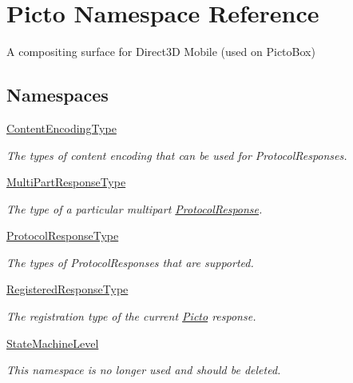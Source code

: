 \hypertarget{namespace_picto}{\section{Picto Namespace Reference}
\label{namespace_picto}
}


A compositing surface for Direct3\-D Mobile (used on Picto\-Box)  


\subsection*{Namespaces}
\begin{DoxyCompactItemize}
\item 
\hyperlink{namespace_picto_1_1_content_encoding_type}{Content\-Encoding\-Type}
\begin{DoxyCompactList}\small\item\em The types of content encoding that can be used for Protocol\-Responses. \end{DoxyCompactList}\item 
\hyperlink{namespace_picto_1_1_multi_part_response_type}{Multi\-Part\-Response\-Type}
\begin{DoxyCompactList}\small\item\em The type of a particular multipart \hyperlink{struct_picto_1_1_protocol_response}{Protocol\-Response}. \end{DoxyCompactList}\item 
\hyperlink{namespace_picto_1_1_protocol_response_type}{Protocol\-Response\-Type}
\begin{DoxyCompactList}\small\item\em The types of Protocol\-Responses that are supported. \end{DoxyCompactList}\item 
\hyperlink{namespace_picto_1_1_registered_response_type}{Registered\-Response\-Type}
\begin{DoxyCompactList}\small\item\em The registration type of the current \hyperlink{namespace_picto}{Picto} response. \end{DoxyCompactList}\item 
\hyperlink{namespace_picto_1_1_state_machine_level}{State\-Machine\-Level}
\begin{DoxyCompactList}\small\item\em This namespace is no longer used and should be deleted. \end{DoxyCompactList}\end{DoxyCompactItemize}
